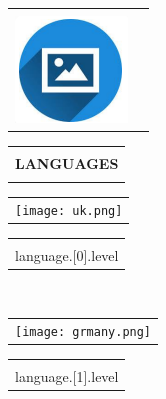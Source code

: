 \documentclass{article}
\makeatletter
\newcommand{\cvsection}[1]{
\setlength{\arrayrulewidth}{1pt}
\begin{tabular}{@{}p{\linewidth}}
 \\
\\
\textbf{\Large #1}  \\[3pt]
\hline
 \\
\end{tabular}
}
\makeatother
\begin{document}
\begin{paracol}{2}
\begin{tabular}{@{}ll}
\begin{minipage}{0.09\linewidth}
         \end{minipage} & {\color{maincolor}{skills.3}} \\[8pt]
         \begin{minipage}{0.09\linewidth}
         \includegraphics[width=\linewidth]{picon.png}
         \end{minipage} & {\color{maincolor}{skills.4}} \\
\end{tabular}

\cvsection{LANGUAGES}

\begin{tabular}{c}
\texttt{[image: uk.png]}
\end{tabular}
\begin{tabular}{p{\linewidth}}
{\color{maincolor}{language.[0].name}} \\
{language.[0].level} \\
\end{tabular}

~ \\[-10pt]

\begin{tabular}{c}
\texttt{[image: grmany.png]}
\end{tabular}
\begin{tabular}{p{\linewidth}}
{\color{maincolor}{language.[1].name}} \\
{language.[1].level} \\
\end{tabular}


\end{paracol}
\end{document}
